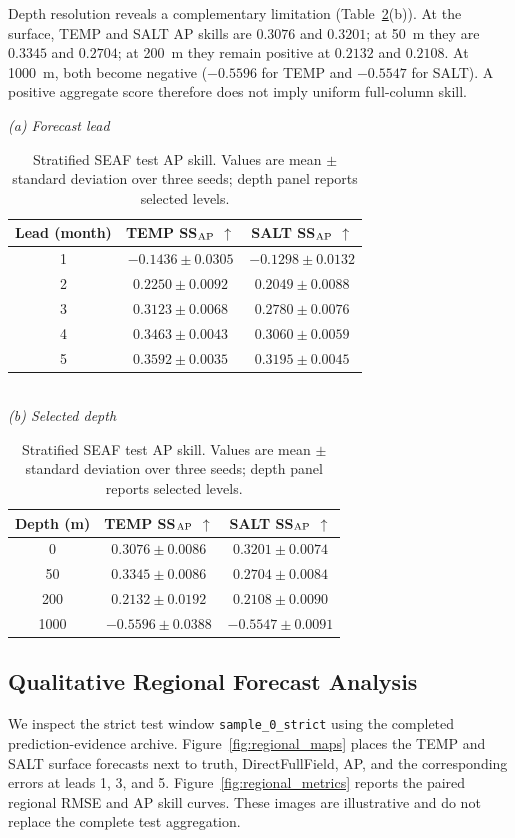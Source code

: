 \documentclass[conference]{IEEEtran}
\begin{document}
Depth resolution reveals a complementary limitation (Table~\ref{tab:stratified}(b)). At the surface, TEMP and SALT AP skills are $0.3076$ and $0.3201$; at 50~m they are $0.3345$ and $0.2704$; at 200~m they remain positive at $0.2132$ and $0.2108$. At 1000~m, both become negative ($-0.5596$ for TEMP and $-0.5547$ for SALT). A positive aggregate score therefore does not imply uniform full-column skill.

\begin{table}[H]
\centering
\caption{Stratified SEAF test AP skill. Values are mean $\pm$ standard deviation over three seeds; depth panel reports selected levels.}
\label{tab:stratified}
\scriptsize
\setlength{\tabcolsep}{4pt}
\renewcommand{\arraystretch}{1.08}
\textit{(a) Forecast lead}\\[2pt]
\begin{tabular}{ccc}
\toprule
Lead (month) & TEMP SS$_{\rm AP}$ $\uparrow$ & SALT SS$_{\rm AP}$ $\uparrow$\\
\midrule
1 & $-0.1436\!\pm\!0.0305$ & $-0.1298\!\pm\!0.0132$\\
2 & $0.2250\!\pm\!0.0092$ & $0.2049\!\pm\!0.0088$\\
3 & $0.3123\!\pm\!0.0068$ & $0.2780\!\pm\!0.0076$\\
4 & $0.3463\!\pm\!0.0043$ & $0.3060\!\pm\!0.0059$\\
5 & $0.3592\!\pm\!0.0035$ & $0.3195\!\pm\!0.0045$\\
\bottomrule
\end{tabular}\\[5pt]
\textit{(b) Selected depth}\\[2pt]
\begin{tabular}{ccc}
\toprule
Depth (m) & TEMP SS$_{\rm AP}$ $\uparrow$ & SALT SS$_{\rm AP}$ $\uparrow$\\
\midrule
0 & $0.3076\!\pm\!0.0086$ & $0.3201\!\pm\!0.0074$\\
50 & $0.3345\!\pm\!0.0086$ & $0.2704\!\pm\!0.0084$\\
200 & $0.2132\!\pm\!0.0192$ & $0.2108\!\pm\!0.0090$\\
1000 & $-0.5596\!\pm\!0.0388$ & $-0.5547\!\pm\!0.0091$\\
\bottomrule
\end{tabular}
\end{table}
\FloatBarrier

\subsection{Qualitative Regional Forecast Analysis}
We inspect the strict test window \texttt{sample\_0\_strict} using the completed prediction-evidence archive. Figure~\ref{fig:regional_maps} places the TEMP and SALT surface forecasts next to truth, DirectFullField, AP, and the corresponding errors at leads 1, 3, and 5. Figure~\ref{fig:regional_metrics} reports the paired regional RMSE and AP skill curves. These images are illustrative and do not replace the complete test aggregation.
\end{document}
